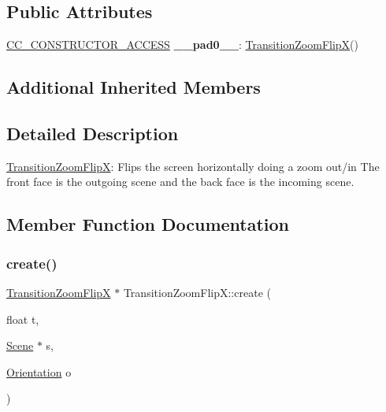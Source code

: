 \subsection*{Public Attributes}
\begin{DoxyCompactItemize}
\item 
\mbox{\label{classTransitionZoomFlipX_a7e16c8e46e05cd7a928325e6af04aa30}} 
\hyperlink{_2cocos2d_2cocos_2base_2ccConfig_8h_a25ef1314f97c35a2ed3d029b0ead6da0}{C\+C\+\_\+\+C\+O\+N\+S\+T\+R\+U\+C\+T\+O\+R\+\_\+\+A\+C\+C\+E\+SS} {\bfseries \+\_\+\+\_\+pad0\+\_\+\+\_\+}\+: \hyperlink{classTransitionZoomFlipX}{Transition\+Zoom\+FlipX}()
\end{DoxyCompactItemize}
\subsection*{Additional Inherited Members}


\subsection{Detailed Description}
\hyperlink{classTransitionZoomFlipX}{Transition\+Zoom\+FlipX}\+: Flips the screen horizontally doing a zoom out/in The front face is the outgoing scene and the back face is the incoming scene. 

\subsection{Member Function Documentation}
\mbox{\label{classTransitionZoomFlipX_ac685ce10503f9fa92d719b2031984288}} 
\subsubsection{\texorpdfstring{create()}{create()}\hspace{0.1cm}{\footnotesize\ttfamily [1/4]}}
{\footnotesize\ttfamily \hyperlink{classTransitionZoomFlipX}{Transition\+Zoom\+FlipX} $\ast$ Transition\+Zoom\+Flip\+X\+::create (\begin{DoxyParamCaption}\item[{float}]{t,  }\item[{\hyperlink{classScene}{Scene} $\ast$}]{s,  }\item[{\hyperlink{classTransitionScene_a0b2b247806fb10a20de0cbc554210c4d}{Orientation}}]{o }\end{DoxyParamCaption})\hspace{0.3cm}{\ttfamily [static]}}

